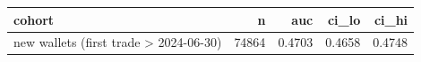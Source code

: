 \begin{tabular}{lrrrr}
\toprule
cohort & n & auc & ci\_lo & ci\_hi \\
\midrule
new wallets (first trade > 2024-06-30) & 74864 & 0.4703 & 0.4658 & 0.4748 \\
\bottomrule
\end{tabular}
